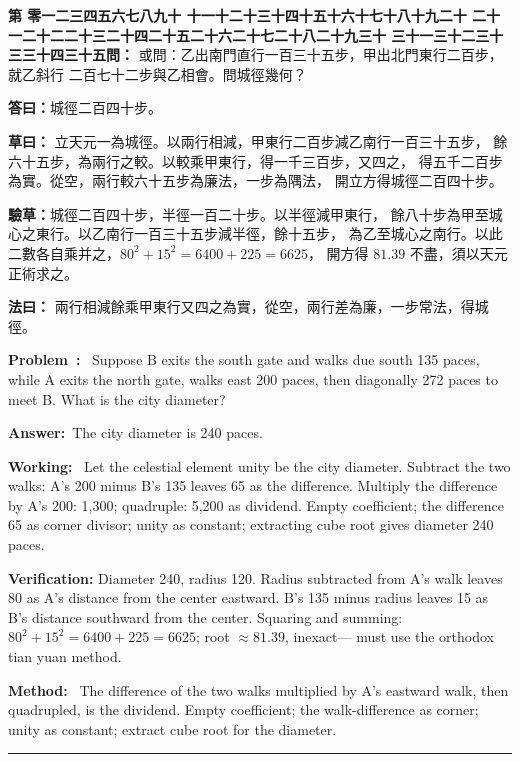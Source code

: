 \documentclass[9pt,a4paper]{article}
\newcounter{probnum}
\newcounter{overallnum}
\newcommand{\chnum}[1]{%
  \ifcase#1 零\or 一\or 二\or 三\or 四\or 五\or 六\or 七\or 八\or 九\or 十\or
    十一\or 十二\or 十三\or 十四\or 十五\or 十六\or 十七\or 十八\or 十九\or 二十\or
    二十一\or 二十二\or 二十三\or 二十四\or 二十五\or 二十六\or 二十七\or 二十八\or 二十九\or 三十\or
    三十一\or 三十二\or 三十三\or 三十四\or 三十五\fi}
\newcommand{\problem}[1]{\stepcounter{probnum}\stepcounter{overallnum}\par\noindent\textbf{\color{volcolor}第\chnum{\value{probnum}}問：}#1\par\vspace{0.15cm}}
\newcommand{\answer}[1]{\par\noindent\textbf{答曰：}#1\par\vspace{0.15cm}}
\newcommand{\working}[1]{\par\noindent\textbf{草曰：}#1\par\vspace{0.15cm}}
\newcommand{\method}[1]{\par\noindent\textbf{法曰：}#1\par\vspace{0.25cm}}
\newcommand{\eproblem}[1]{\par\noindent\textbf{\color{volcolor}Problem~\theoverallnum:}~#1\par\vspace{0.15cm}}
\newcommand{\eanswer}[1]{\par\noindent\textbf{Answer:}~#1\par\vspace{0.15cm}}
\newcommand{\eworking}[1]{\par\noindent\textbf{Working:}~#1\par\vspace{0.15cm}}
\newcommand{\emethod}[1]{\par\noindent\textbf{Method:}~#1\par\vspace{0.25cm}}
\begin{document}
\noindent\begin{minipage}[t]{0.48\textwidth}
\problem{
或問：乙出南門直行一百三十五步，甲出北門東行二百步，就乙斜行
二百七十二步與乙相會。問城徑幾何？
}

\answer{城徑二百四十步。}

\working{
立天元一為城徑。以兩行相減，甲東行二百步減乙南行一百三十五步，
餘六十五步，為兩行之較。以較乘甲東行，得一千三百步，又四之，
得五千二百步為實。從空，兩行較六十五步為廉法，一步為隅法，
開立方得城徑二百四十步。

\textbf{驗草：}城徑二百四十步，半徑一百二十步。以半徑減甲東行，
餘八十步為甲至城心之東行。以乙南行一百三十五步減半徑，餘十五步，
為乙至城心之南行。以此二數各自乘并之，$80^2 + 15^2 = 6400 + 225 = 6625$，
開方得 $81.39$ 不盡，須以天元正術求之。
}

\method{
兩行相減餘乘甲東行又四之為實，從空，兩行差為廉，一步常法，得城徑。
}
\end{minipage}%
\hfill%
\begin{minipage}[t]{0.50\textwidth}
\eproblem{
Suppose B exits the south gate and walks due south 135 paces, while A exits
the north gate, walks east 200 paces, then diagonally 272 paces to meet B.
What is the city diameter?
}

\eanswer{The city diameter is 240 paces.}

\eworking{
Let the celestial element unity be the city diameter. Subtract the two walks:
A's 200 minus B's 135 leaves 65 as the difference. Multiply the difference
by A's 200: 1,300; quadruple: 5,200 as dividend. Empty coefficient; the
difference 65 as corner divisor; unity as constant; extracting cube root
gives diameter 240 paces.

\textbf{Verification:} Diameter 240, radius 120. Radius subtracted from
A's walk leaves 80 as A's distance from the center eastward. B's 135 minus
radius leaves 15 as B's distance southward from the center. Squaring and
summing: $80^2 + 15^2 = 6400 + 225 = 6625$; root $\approx 81.39$, inexact---
must use the orthodox tian yuan method.
}

\emethod{
The difference of the two walks multiplied by A's eastward walk, then
quadrupled, is the dividend. Empty coefficient; the walk-difference as corner;
unity as constant; extract cube root for the diameter.
}
\end{minipage}
\vspace{0.15cm}

\vspace{0.15cm}
\noindent\rule{\textwidth}{0.2pt}
\vspace{0.15cm}
\end{document}
